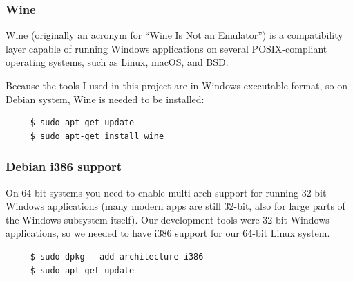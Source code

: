 \documentclass{swfcthesis}
\begin{document}
\subsubsection{Wine}

Wine (originally an acronym for ``Wine Is Not an Emulator'') is a compatibility layer
capable of running Windows applications on several POSIX-compliant operating systems, such
as Linux, macOS, and BSD\cite{wiki:wine}.

Because the tools I used in this project are in Windows executable format, so on Debian system,
Wine is needed to be installed:

\begin{verbatim}
     $ sudo apt-get update
     $ sudo apt-get install wine
\end{verbatim}

\subsubsection{Debian i386 support}

On 64-bit systems you need to enable multi-arch support for running 32-bit Windows
applications (many modern apps are still 32-bit, also for large parts of the Windows
subsystem itself). Our development tools were 32-bit Windows applications, so we needed to
have i386 support for our 64-bit Linux system.

\begin{verbatim}
     $ sudo dpkg --add-architecture i386
     $ sudo apt-get update
\end{verbatim}

\iffalse %



\end{document}

